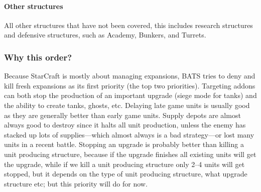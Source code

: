 \paragraph{Other structures \attackCoordinatorWeightsOtherStructure}
All other structures that have not been covered, this includes research structures and defensive
structures, such as Academy, Bunkers, and Turrets.

\subsubsection{Why this order?}
Because StarCraft is mostly about managing expansions\cite{day9}, BATS tries to deny and kill fresh
expansions as its first priority (the top two priorities). Targeting addons can both stop the
production of an important upgrade (siege mode for tanks) and the ability to create tanks, ghosts,
etc. Delaying late game units is usually good as they are generally better than early game units.
Supply depots are almost always good to destroy since it halts all unit production, unless the enemy
has stacked up lots of supplies—which almost always is a bad strategy—or lost many units in a recent
battle. Stopping an upgrade is probably better than killing a unit producing structure, because if
the upgrade finishes all existing units will get the upgrade, while if we kill a unit producing
structure only 2–4 units will get stopped, but it depends on the type of unit producing structure,
what upgrade structure etc; but this priority will do for now.
